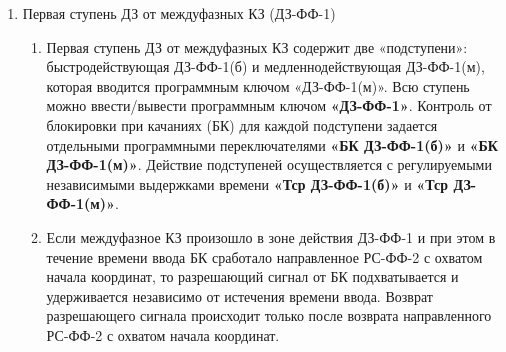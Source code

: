 \begin{enumerate}[label=\arabic{section}.\arabic{subsection}.\arabic{enumi}, labelsep=4pt, leftmargin=0pt, itemindent=57pt, itemsep=0pt, parsep=5pt]
\begin{enumerate}[label=\arabic{section}.\arabic{subsection}.\arabic{enumi}.\arabic*, labelsep=4pt, leftmargin=0em, itemindent=65pt, parsep=0pt]
\item
Если за время пуска от БК происходит срабатывание ненаправленного РС ступени ДЗ, то разращение
от БК подхватывается и удерживается до пропадания условий срабатывания ненаправленного РС
соответствующей ступени.

\item
В составе логики дистанционной защиты предусмотрено четыре режима оперативного ускорения ДЗ.





































\end{enumerate}

\item\label{sec:sec2} Первая ступень ДЗ от междуфазных КЗ (ДЗ-ФФ-1)
\begin{enumerate}[label=\arabic{section}.\arabic{subsection}.\arabic{enumi}.\arabic*, labelsep=4pt, leftmargin=0em, itemindent=65pt, parsep=0pt]

\item
Первая  ступень  ДЗ  от  междуфазных  КЗ  содержит  две  «подступени»:  быстродействующая ДЗ-ФФ-1(б)  и  медленнодействующая  ДЗ-ФФ-1(м),  которая  вводится программным  ключом  «ДЗ-ФФ-1(м)». Всю ступень можно ввести/вывести программным ключом \textbf{«ДЗ-ФФ-1»}. Контроль от блокировки при качаниях (БК)  для  каждой  подступени  задается  отдельными  программными  переключателями  \textbf{«БК  ДЗ-ФФ-1(б)»}  и  \textbf{«БК  ДЗ-ФФ-1(м)»}.  Действие  подступеней  осуществляется  с  регулируемыми  независимыми  выдержками времени \textbf{«Тср ДЗ-ФФ-1(б)»} и \textbf{«Тср ДЗ-ФФ-1(м)»}.


\item
Если междуфазное КЗ произошло в зоне действия ДЗ-ФФ-1 и при этом в течение времени ввода БК сработало направленное РС-ФФ-2 с охватом начала координат, то разрешающий сигнал от БК подхватывается и удерживается независимо от истечения времени ввода. Возврат разрешающего сигнала происходит только после возврата направленного РС-ФФ-2 с охватом начала координат. 


\end{enumerate}
\end{enumerate}
